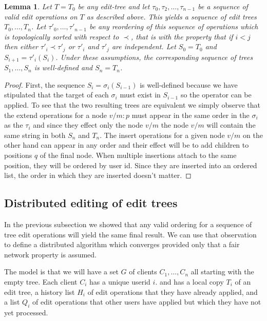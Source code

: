 \documentclass{amsart}
\newtheorem{lemma}[theorem]{Lemma}
\begin{document}
\begin{lemma}
Let $T=T_0$ be any edit-tree and let $\tau_0,\tau_2,\ldots,\tau_{n-1}$
be a sequence of valid edit operations on $T$ as described above.
This yields a sequence of edit trees $T_0,\ldots,T_n$. Let 
$\tau'_0,\ldots,\tau'_{n-1}$ be any reordering of this sequence of operations
which is topologically sorted with respect to $\prec$, that is
with the property that if $i<j$ then either $\tau'_i\prec\tau'_j$ or
$\tau'_i$ and $\tau'_j$ are independent. Let $S_0=T_0$ and $S_{i+1} = \tau'_i(S_i)$.
Under these assumptions, the corresponding sequence of trees
$S_1,\ldots,S_n$ is well-defined and $S_n=T_n$.
\end{lemma}

\begin{proof}
First, the sequence $S_{i}=\sigma_i(S_{i-1})$ is well-defined because we have
stipulated that the target of each $\sigma_i$ must exist in $S_{i-1}$ so the
operator can be applied. To see that the two resulting trees are equivalent
we simply observe that the extend operations for a node $v/m:p$ must appear
in the same order in the $\sigma_i$ as the $\tau_i$ and since they effect only
the node $v/m$ the node $v/m$ will contain the same string in both $S_n$ and $T_n$.
The insert operations for a given node $v/m$ on the other hand can appear
in any order and their effect will be to add children to positions $q$
of the final node. When multiple insertions attach to the same position, they
will be ordered by user id. Since they are inserted into an ordered list,
the order in which they are inserted doesn't matter.
\end{proof}

\subsection{Distributed editing of edit trees}
In the previous subsection we showed that any valid ordering for a sequence
of tree edit operations will yield the same final result. We can use that
observation to define a distributed algorithm which converges provided only
that a fair network property is assumed.

The model is that we will have a set $G$ of clients $C_1,\ldots,C_n$
all starting with the empty tree. Each client $C_i$ has a unique userid $i$.
and has a local copy $T_i$ of an edit tree,
a history list $H_i$ of edit operations that they have already applied, and
a list $Q_i$ of edit operations that other users have applied but which they
have not yet processed.
\end{document}
